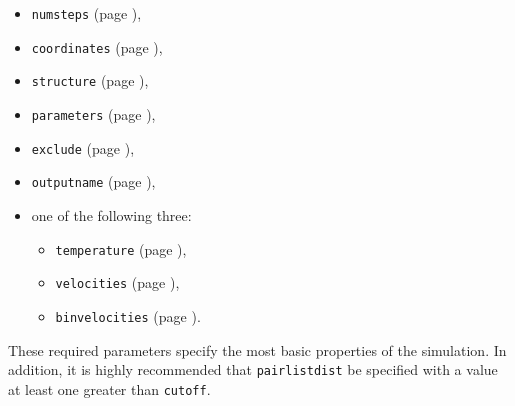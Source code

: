 \begin{itemize}

\item
{\tt numsteps} (page \pageref{param:numsteps}),

\item
{\tt coordinates} (page \pageref{param:coordinates}),

\item
{\tt structure} (page \pageref{param:structure}),

\item
{\tt parameters} (page \pageref{param:parameters}),

\item
{\tt exclude} (page \pageref{param:exclude}), 

\item
{\tt outputname} (page \pageref{param:outputname}), 

\item
one of the following three:
\begin{itemize}
\item
{\tt temperature} (page \pageref{param:temperature}),

\item
{\tt velocities} (page \pageref{param:velocities}),

\item
{\tt binvelocities} (page \pageref{param:binvelocities}).
\end{itemize}

\end{itemize}

\noindent These required parameters specify the most basic properties of
the simulation.  %
In addition, it is highly recommended that 
{\tt pairlistdist} be specified with a 
value at least one greater than {\tt cutoff}.

